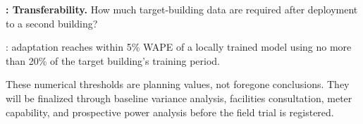 \textbf{: Transferability.} How much target-building data are required after deployment to a second building?

: adaptation reaches within 5\% WAPE of a locally trained model using no more than 20\% of the target building's training period.

These numerical thresholds are planning values, not foregone conclusions. They will be finalized through baseline variance analysis, facilities consultation, meter capability, and prospective power analysis before the field trial is registered.
